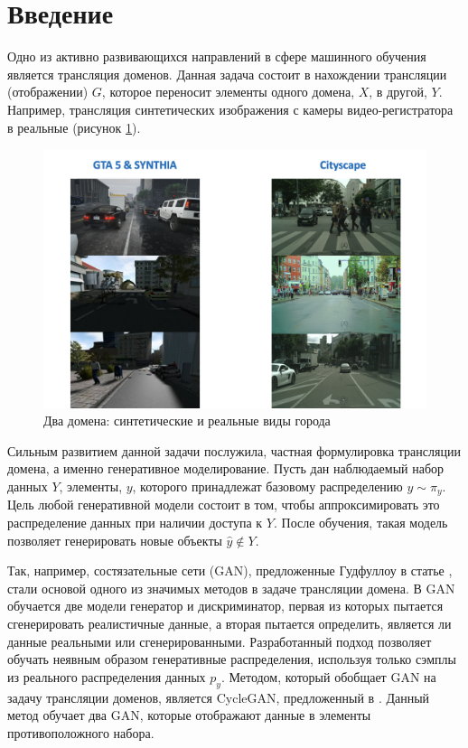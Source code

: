 \section{Введение}
\label{sec:Chapter0} 

Одно из активно развивающихся направлений в сфере машинного обучения является трансляция доменов. Данная задача состоит в нахождении трансляции (отображении) $G$, которое переносит элементы одного домена, $X$, в другой, $Y$. Например, трансляция синтетических изображения с камеры видео-регистратора в реальные (рисунок \ref{fig:domains-example}). 

\begin{figure}
    \centering
    \includegraphics[scale=0.3]{images/domains_example.png}
    \caption{Два домена: синтетические и реальные виды города}
    \label{fig:domains-example}
\end{figure}

Сильным развитием данной задачи послужила, частная формулировка трансляции домена, а именно генеративное моделирование. Пусть дан наблюдаемый набор данных $Y$, элементы, $y$, которого принадлежат базовому распределению $y \sim \pi_y$. Цель любой генеративной модели состоит в том, чтобы аппроксимировать это распределение данных при наличии доступа к $Y$. После обучения, такая модель позволяет генерировать новые объекты $\hat y \notin Y$.

Так, например, состязательные сети (GAN), предложенные Гудфуллоу в статье \cite{gan}, стали основой одного из значимых методов в задаче трансляции домена. В GAN обучается две модели генератор и дискриминатор, первая из которых пытается сгенерировать реалистичные данные, а вторая пытается определить, является ли данные реальными или сгенерированными. Разработанный подход позволяет обучать неявным образом генеративные распределения, используя только сэмплы из реального распределения данных $p_y$. Методом, который обобщает GAN на задачу трансляции доменов, является CycleGAN, предложенный в \cite{cycle-gan}. Данный метод обучает два GAN, которые отображают данные в элементы противоположного набора.

